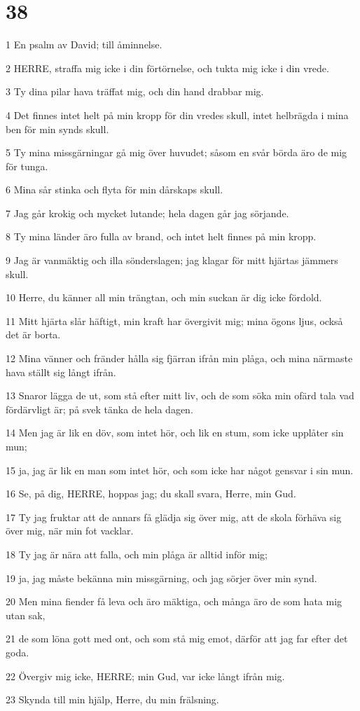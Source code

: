 \chapter{38}

\par 1 En psalm av David; till åminnelse.
\par 2 HERRE, straffa mig icke i din förtörnelse, och tukta mig icke i din vrede.
\par 3 Ty dina pilar hava träffat mig, och din hand drabbar mig.
\par 4 Det finnes intet helt på min kropp för din vredes skull, intet helbrägda i mina ben för min synds skull.
\par 5 Ty mina missgärningar gå mig över huvudet; såsom en svår börda äro de mig för tunga.
\par 6 Mina sår stinka och flyta för min dårskaps skull.
\par 7 Jag går krokig och mycket lutande; hela dagen går jag sörjande.
\par 8 Ty mina länder äro fulla av brand, och intet helt finnes på min kropp.
\par 9 Jag är vanmäktig och illa sönderslagen; jag klagar för mitt hjärtas jämmers skull.
\par 10 Herre, du känner all min trängtan, och min suckan är dig icke fördold.
\par 11 Mitt hjärta slår häftigt, min kraft har övergivit mig; mina ögons ljus, också det är borta.
\par 12 Mina vänner och fränder hålla sig fjärran ifrån min plåga, och mina närmaste hava ställt sig långt ifrån.
\par 13 Snaror lägga de ut, som stå efter mitt liv, och de som söka min ofärd tala vad fördärvligt är; på svek tänka de hela dagen.
\par 14 Men jag är lik en döv, som intet hör, och lik en stum, som icke upplåter sin mun;
\par 15 ja, jag är lik en man som intet hör, och som icke har något gensvar i sin mun.
\par 16 Se, på dig, HERRE, hoppas jag; du skall svara, Herre, min Gud.
\par 17 Ty jag fruktar att de annars få glädja sig över mig, att de skola förhäva sig över mig, när min fot vacklar.
\par 18 Ty jag är nära att falla, och min plåga är alltid inför mig;
\par 19 ja, jag måste bekänna min missgärning, och jag sörjer över min synd.
\par 20 Men mina fiender få leva och äro mäktiga, och många äro de som hata mig utan sak,
\par 21 de som löna gott med ont, och som stå mig emot, därför att jag far efter det goda.
\par 22 Övergiv mig icke, HERRE; min Gud, var icke långt ifrån mig.
\par 23 Skynda till min hjälp, Herre, du min frälsning.

